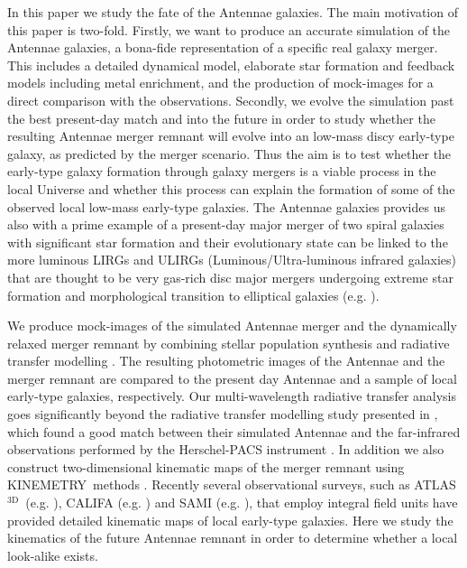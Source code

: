 \documentclass[a4paper,fleqn,usenatbib]{mnras}
\newcommand{\atlas}{\textsc{ATLAS$^\mathrm{3D}$}}
\newcommand{\kinemetry}{\textsc{KINEMETRY}}
\begin{document}
In this paper we study the fate of the Antennae galaxies. The main motivation of this paper is two-fold. Firstly, we want to produce an accurate simulation
of the Antennae galaxies, a bona-fide representation of a specific real galaxy merger. This includes a detailed dynamical model, 
elaborate star formation and feedback models including metal enrichment, and the production of mock-images for a direct comparison with the 
observations. Secondly, we evolve the simulation past the best present-day match and into the future in order to study whether the resulting 
Antennae merger remnant will evolve into an low-mass discy early-type galaxy, as predicted by the merger scenario. Thus the aim is to test whether the 
early-type galaxy formation through galaxy mergers is a viable process in the local Universe and whether this process can explain the formation of some of the
observed local low-mass early-type galaxies. The Antennae galaxies provides us also with a prime example of a present-day major merger of
two spiral galaxies with significant star formation and their evolutionary state can be linked to the more luminous LIRGs and 
ULIRGs (Luminous/Ultra-luminous infrared galaxies) that are thought to be very gas-rich disc major mergers undergoing extreme star formation and morphological
transition to elliptical galaxies (e.g. \citealt{1998ApJ...498..579G,2006ApJ...638..745D,2006ApJ...651..835D,2017MNRAS.471.2059V}). 

We produce mock-images of the simulated Antennae merger and the dynamically relaxed merger remnant by combining stellar population synthesis 
and radiative transfer modelling \citep{2003MNRAS.344.1000B,2008ApJS..176..438G,2015A&C.....9...20C}.
The resulting photometric images of the Antennae and the merger remnant are compared to the present 
day Antennae and a sample of local early-type galaxies, respectively.
Our multi-wavelength radiative transfer analysis goes significantly beyond the radiative transfer modelling study presented in \citet{2013MNRAS.434..696K}, which found
a good match between their simulated Antennae and the far-infrared observations performed by the Herschel-PACS instrument \citep{2010A&A...518L..44K}.
In addition we also construct two-dimensional kinematic maps of the merger
remnant using \kinemetry\ methods \citep{2006MNRAS.366..787K,2014MNRAS.444.3357N}. Recently several observational surveys, 
such as \atlas\ (e.g. \citealt{2011MNRAS.413..813C,2011MNRAS.416.1654B}), CALIFA (e.g. \citealt{2012A&A...538A...8S,2014A&A...567A.132W}) and 
SAMI (e.g. \citealt{2015MNRAS.447.2857B}), that employ integral field units have provided detailed kinematic maps of local early-type galaxies. Here 
we study the kinematics of the future
Antennae remnant in order to determine whether a local look-alike exists. 
\end{document}
